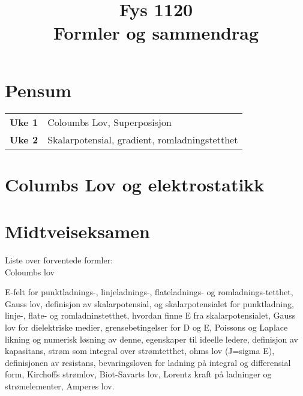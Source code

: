\documentclass[
12pt, reprint, aip, onecolumn, notitlepage
]{revtex4-1}
\begin{document}
	\title{Fys 1120\\ \normalsize Formler og sammendrag} 
	\maketitle 


\section{Pensum} 

\begin{table}[!h]
	\begin{tabular}{ l l }
		\textbf{Uke 1} & Coloumbs Lov, Superposisjon\\ 
	   \textbf{Uke 2} & Skalarpotensial, gradient, romladningstetthet
 	\end{tabular}
\end{table}

\section{Columbs Lov og elektrostatikk}





\section{Midtveiseksamen}
Liste over forventede formler: \\
Coloumbs lov

E-felt for punktladnings-, linjeladnings-, flateladnings- og romladnings-tetthet, Gauss lov, definisjon av skalarpotensial, og skalarpotensialet for punktladning, linje-, flate- og romladninstetthet, hvordan finne E fra skalarpotensialet, Gauss lov for dielektriske medier, grensebetingelser for D og E, Poissons og Laplace likning og numerisk løsning av denne, egenskaper til ideelle ledere, definisjon av kapasitans, strøm som integral over strømtetthet, ohms lov (J=sigma E), definisjonen av resistans, bevaringsloven for ladning på integral og differensial form, Kirchoffs strømlov, Biot-Savarts lov, Lorentz kraft på ladninger og strømelementer, Amperes lov.
\end{document}
